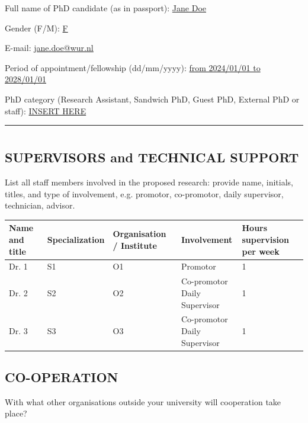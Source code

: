\documentclass{article}
\begin{document}
Full name of PhD candidate (as in passport): \underline{Jane Doe}

Gender (F/M): \underline{F}

E-mail: \underline{\href{mailto:jane.doe@wur.nl}{jane.doe@wur.nl}}

Period of appointment/fellowship (dd/mm/yyyy): \underline{from 2024/01/01 to 2028/01/01}

PhD category (Research Assistant, Sandwich PhD, Guest PhD, External PhD or staff): \underline{INSERT HERE}

\begin{center}
    \rule{\textwidth}{0.5pt}
\end{center}

\section{}

\subsection{SUPERVISORS and TECHNICAL SUPPORT}

List all staff members involved in the proposed research: provide name, initials, titles, and type of involvement, e.g. promotor, co-promotor, daily supervisor, technician, advisor.

\begin{table}[H]
    \centering
    \begin{tabularx}{\textwidth}{|X|X|X|X|X|}
        \hline
        Name and title            & Specialization                                                                     & Organisation / Institute                                         & Involvement              & Hours supervision per week \\
        \hline
        \hline
        Dr. 1   &  S1    & O1     & Promotor & 1 \\ \hline
        Dr. 2   &  S2    & O2     & \makecell[l]{Co-promotor \\ Daily Supervisor} & 1                           \\ \hline
        Dr. 3 & S3       & O3     & \makecell[l]{Co-promotor \\ Daily Supervisor} & 1                           \\  \hline
    \end{tabularx}
\end{table}

\subsection{CO-OPERATION}
With what other organisations outside your university will cooperation take place?
\end{document}

